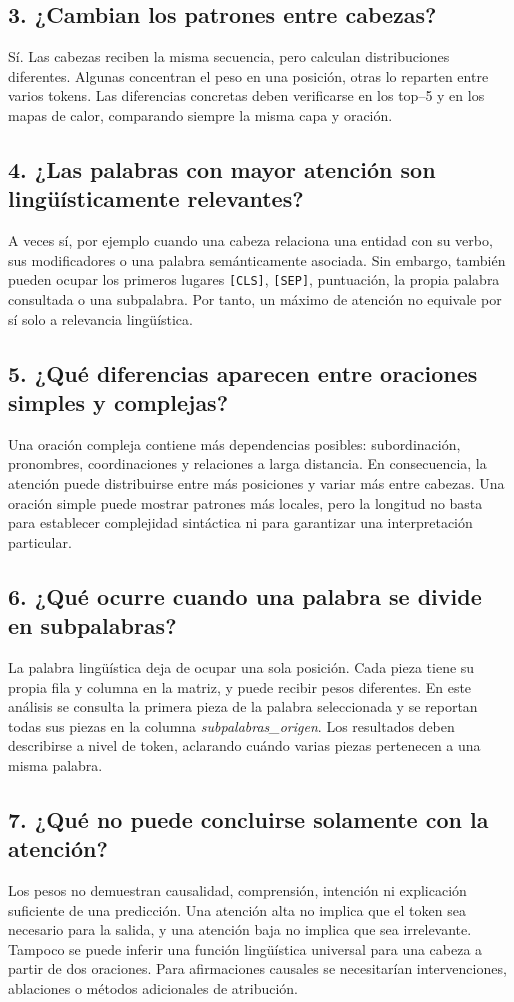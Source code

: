 \documentclass[12pt,a4paper]{article}
\begin{document}
\subsection{3. ¿Cambian los patrones entre cabezas?}
Sí. Las cabezas reciben la misma secuencia, pero calculan distribuciones diferentes. Algunas concentran el peso en una posición, otras lo reparten entre varios tokens. Las diferencias concretas deben verificarse en los top--5 y en los mapas de calor, comparando siempre la misma capa y oración.

\subsection{4. ¿Las palabras con mayor atención son lingüísticamente relevantes?}
A veces sí, por ejemplo cuando una cabeza relaciona una entidad con su verbo, sus modificadores o una palabra semánticamente asociada. Sin embargo, también pueden ocupar los primeros lugares \texttt{[CLS]}, \texttt{[SEP]}, puntuación, la propia palabra consultada o una subpalabra. Por tanto, un máximo de atención no equivale por sí solo a relevancia lingüística.

\subsection{5. ¿Qué diferencias aparecen entre oraciones simples y complejas?}
Una oración compleja contiene más dependencias posibles: subordinación, pronombres, coordinaciones y relaciones a larga distancia. En consecuencia, la atención puede distribuirse entre más posiciones y variar más entre cabezas. Una oración simple puede mostrar patrones más locales, pero la longitud no basta para establecer complejidad sintáctica ni para garantizar una interpretación particular.

\subsection{6. ¿Qué ocurre cuando una palabra se divide en subpalabras?}
La palabra lingüística deja de ocupar una sola posición. Cada pieza tiene su propia fila y columna en la matriz, y puede recibir pesos diferentes. En este análisis se consulta la primera pieza de la palabra seleccionada y se reportan todas sus piezas en la columna \emph{subpalabras\_origen}. Los resultados deben describirse a nivel de token, aclarando cuándo varias piezas pertenecen a una misma palabra.

\subsection{7. ¿Qué no puede concluirse solamente con la atención?}
Los pesos no demuestran causalidad, comprensión, intención ni explicación suficiente de una predicción. Una atención alta no implica que el token sea necesario para la salida, y una atención baja no implica que sea irrelevante. Tampoco se puede inferir una función lingüística universal para una cabeza a partir de dos oraciones. Para afirmaciones causales se necesitarían intervenciones, ablaciones o métodos adicionales de atribución.
\end{document}

